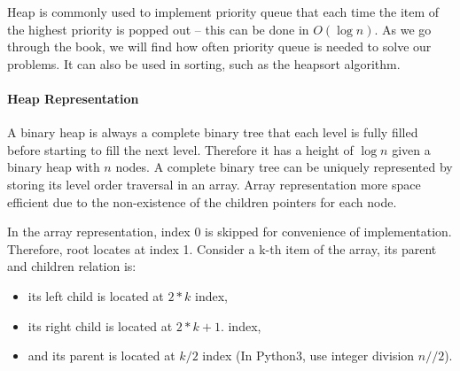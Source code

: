 \documentclass[../main.tex]{subfiles}
\begin{document}
Heap is commonly used to implement priority queue that each time the item of the highest priority is popped out -- this can be done in $O(\log n)$. As we go through the book, we will find how often priority queue is needed to solve our problems.  It can also be used in sorting, such as the heapsort algorithm. 

\paragraph{Heap Representation}
A binary heap is always a complete binary tree that each level is fully filled before starting to fill the next level. Therefore it has a height of $\log n$ given a binary heap with $n$ nodes.  A complete binary tree can be uniquely represented by storing its level order traversal in an array.  Array representation more space efficient  due to the non-existence of the children pointers for each node. 

In the array representation, index 0 is skipped for convenience of implementation. Therefore, root locates at index 1. Consider a k-th item of the array, its parent and children relation is:
\begin{itemize}
    \item its left child is located at $2*k$ index, 
    \item its right child is located at $2*k+1$. index, 
    \item and its parent is located at $k/2$ index (In Python3, use integer division $n//2$).
\end{itemize}




\end{document}
